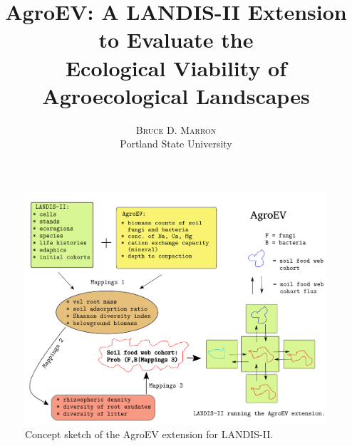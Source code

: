 \documentclass[twoside]{article}	%
\title{\vspace{-15mm}\fontsize{14pt}{10pt}\selectfont\textbf{AgroEV: A LANDIS-II Extension to Evaluate the \\
Ecological Viability of Agroecological Landscapes}} %
\author{
\large
\textsc{Bruce D. Marron} \\ %
\normalsize Portland State University \\ %
\vspace{-5mm}
}
\date{}
\begin{document}
\maketitle                %
\thispagestyle{fancy}     %






\begin{figure}
  \begin{center}
    \includegraphics[scale = 0.60]{graphics/AgroEV_doc.png}
    \caption{Concept sketch of the AgroEV extension for LANDIS-II.}
    \label{fig:}
  \end{center}
\end{figure}



\newpage


\end{document}
